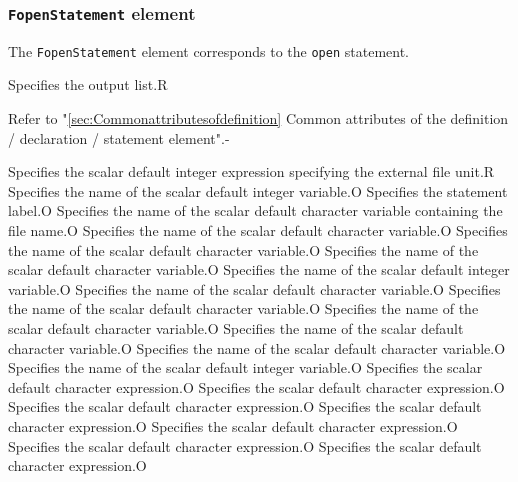\subsubsection{ {\tt FopenStatement} element}

The {\tt FopenStatement} element corresponds to the {\tt open} statement.


\begin{XcodeMLChildElements}
{Specifies the output list.}{R}
\end{XcodeMLChildElements}

\begin{XcodeMLAttributes}
{Refer to "\ref{sec:Commonattributesofdefinition} Common attributes of the definition / declaration / statement element".}{-}
\end{XcodeMLAttributes}

\begin{XcodeMLControlList}
{Specifies the scalar default integer expression specifying the external file unit.}{R}
{Specifies the name of the scalar default integer variable.}{O}
{Specifies the statement label.}{O}
{Specifies the name of the scalar default character variable containing the file name.}{O}
{Specifies the name of the scalar default character variable.}{O}
{Specifies the name of the scalar default character variable.}{O}
{Specifies the name of the scalar default character variable.}{O}
{Specifies the name of the scalar default integer variable.}{O}
{Specifies the name of the scalar default character variable.}{O}
{Specifies the name of the scalar default character variable.}{O}
{Specifies the name of the scalar default character variable.}{O}
{Specifies the name of the scalar default character variable.}{O}
{Specifies the name of the scalar default character variable.}{O}
{Specifies the name of the scalar default integer variable.}{O}
{Specifies the scalar default character expression.}{O}
{Specifies the scalar default character expression.}{O}
{Specifies the scalar default character expression.}{O}
{Specifies the scalar default character expression.}{O}
{Specifies the scalar default character expression.}{O}
{Specifies the scalar default character expression.}{O}
{Specifies the scalar default character expression.}{O}
\end{XcodeMLControlList}


